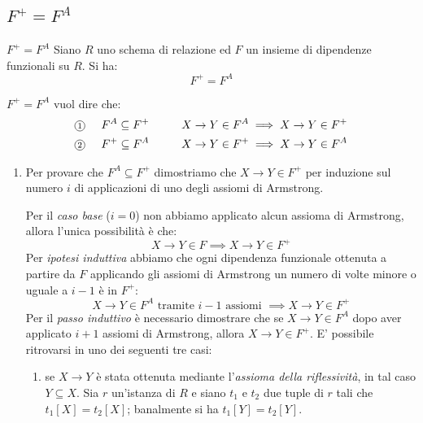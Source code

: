 \subsection{$F^+=F^A$}
\begin{Thm}{$F^+=F^A$}{}\label{thm:F+=FA}
    Siano $R$ uno schema di relazione ed $F$ un insieme di dipendenze funzionali su $R$. Si ha:
    \begin{equation*}
        F^+=F^A
    \end{equation*}
    \begin{demonstration}
        $F^+=F^A$ vuol dire che:
        \begin{align*}
            &\circled{1}\hspace{0.5cm}F^A\subseteq F^+\hspace{1cm}X\to Y\in F^A\implies X\to Y\in F^+\\
            &\circled{2}\hspace{0.5cm}F^+\subseteq F^A\hspace{1cm}X\to Y\in F^+\implies X\to Y\in F^A\\
        \end{align*}
        \begin{enumerate}
            \item Per provare che $F^A\subseteq F^+$ dimostriamo che $X\to Y\in F^+$ per induzione sul numero $i$ di applicazioni di uno degli assiomi di Armstrong.
            
            Per il \textit{caso base} ($i = 0$) non abbiamo applicato alcun assioma di Armstrong, allora l'unica possibilità è che:
            \begin{equation*}
                X\to Y\in F\implies X\to Y\in F^+
            \end{equation*}
            Per \textit{ipotesi induttiva} abbiamo che ogni dipendenza funzionale ottenuta a partire da $F$ applicando gli assiomi di Armstrong un numero di volte minore o uguale a $i-1$ è in $F^+$:
            \begin{equation*}
                X \to Y \in F^A \mbox{ tramite }i-1\mbox{ assiomi }\implies X \to Y \in F^+
            \end{equation*}
            Per il \textit{passo induttivo} è necessario dimostrare che se $X \to Y \in F^A$ dopo aver applicato $i + 1$ assiomi di Armstrong, allora $X \to Y \in F^+$. E' possibile ritrovarsi in uno dei seguenti tre casi:
            \begin{enumerate}[label=(\alph*)]
                \item se $X\to Y$ è stata ottenuta mediante l'\textit{assioma della riflessività}, in tal caso $Y\subseteq X$. Sia $r$ un'istanza di $R$ e siano $t_1$ e $t_2$ due tuple di $r$ tali che $t_1[X]=t_2[X]$; banalmente si ha $t_1[Y]=t_2[Y]$.


\end{enumerate}
\end{enumerate}
\end{demonstration}
\end{Thm}
